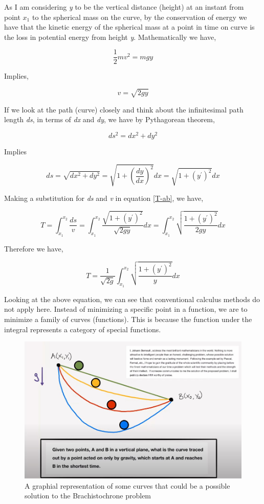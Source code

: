 {As I am considering \textit{y} to be the vertical distance (height) at an instant from point $x_{1}$ to the spherical mass on the curve, by the conservation of energy we have that the kinetic energy of the spherical mass at a point in time on curve is the loss in potential energy from height \textit{y}. Mathematically we have,}

	$$\frac{1}{2}mv^2 = mgy$$ 

{Implies,}

	$$v = \sqrt{2gy}$$

{If we look at the path (curve) closely and think about the infinitesimal path length \textit{ds}, in terms of \textit{dx} and \textit{dy}, we have by Pythagorean theorem,}

	$$ds^2 = dx^2 + dy^2$$

{Implies}

	$$ds = \sqrt{dx^2 + dy^2} = \sqrt{1 + \left(\frac{dy}{dx}\right)^2} dx = \sqrt{1 + \left(y^{\prime}\right)^2} dx$$

{Making a substitution for \textit{ds} and \textit{v} in equation \ref{T-ab}, we have,}

	$$T = \int_{x_1}^{x_2} \frac{ds}{v} = \int_{x_1}^{x_2} \frac{\sqrt{1 + \left(y^{\prime}\right)^2}}{\sqrt{2gy}} dx = \int_{x_1}^{x_2} \sqrt{\frac{1 + \left(y^{\prime}\right)^2}{2gy}} dx$$

{Therefore we have,}

	\begin{equation}
		T = \frac{1}{\sqrt{2g}}\int_{x_1}^{x_2} \sqrt{\frac{1 + \left(y^{\prime}\right)^2}{y}} dx
		\label{Tmin}
	\end{equation}

{Looking at the above equation, we can see that conventional calculus methods do not apply here. Instead of minimizing a specific point in a function, we are to minimize a family of curves (functions). This is because the function under the integral represents a category of special functions.}

\begin{figure}[H]
\centering
\includegraphics[width=15cm]{OrgProbDia.jpg}
    		\caption{{A graphial representation of some curves that could be a possible solution to the Brachistochrone problem}}
\end{figure}

